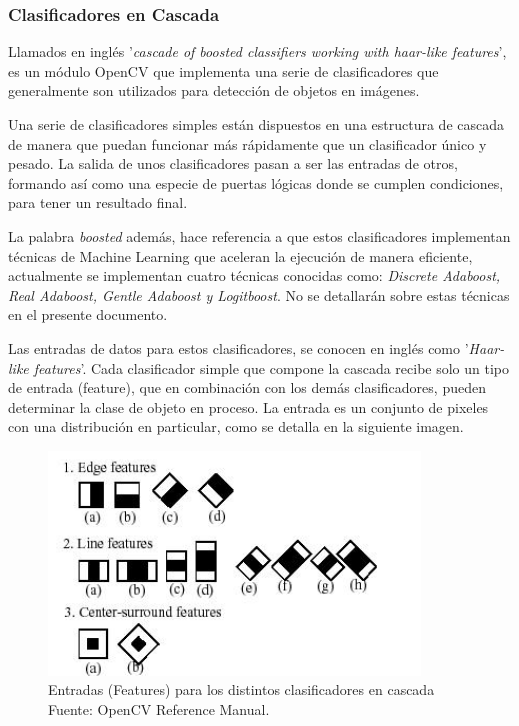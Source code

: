 \documentclass[a4paper,12pt,oneside,spanish]{book}
\begin{document}
\subsubsection{Clasificadores en Cascada}

Llamados en inglés '\textit{cascade of boosted classifiers working with haar-like features}', es un módulo OpenCV que implementa una serie de clasificadores que generalmente son utilizados para detección de objetos en imágenes. \par

Una serie de clasificadores simples están dispuestos en una estructura de cascada de manera que puedan funcionar más rápidamente que un clasificador único y pesado. La salida de unos clasificadores pasan a ser las entradas de otros, formando así como una especie de puertas lógicas donde se cumplen condiciones, para tener un resultado final. \par

La palabra \textit{boosted} además, hace referencia a que estos clasificadores implementan técnicas de Machine Learning que aceleran la ejecución de manera eficiente, actualmente se implementan cuatro técnicas conocidas como: \textit{Discrete Adaboost, Real Adaboost, Gentle Adaboost y Logitboost}. No se detallarán sobre estas técnicas en el presente documento.\par

Las entradas de datos para estos clasificadores, se conocen en inglés como '\textit{Haar-like features}'. Cada clasificador simple que compone la cascada recibe solo un tipo de entrada (feature), que en combinación con los demás clasificadores, pueden determinar la clase de objeto en proceso. La entrada es un conjunto de pixeles con una distribución en particular, como se detalla en la siguiente imagen.\par

\begin{figure}[h!]
	\includegraphics[width=280pt]{Imagenes/haarlike.jpg}
	\centering
	\caption{Entradas (Features) para los distintos clasificadores en cascada Fuente: OpenCV Reference Manual.}
	\label{fig:haarlike1}
\end{figure}
\end{document}
